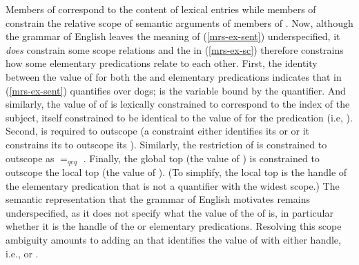 \documentclass[output=paper]{langsci/langscibook}
\begin{document}
Members of  correspond to the content of lexical entries while members of  constrain the relative scope of semantic arguments of members of . Now, although the grammar of English leaves the meaning of (\ref{mrs-ex-sent}) underspecified, it \emph{does} constrain some scope relations and the  in (\ref{mrs-ex-sc}) therefore constrains how some elementary predications relate to each other. First, the identity between the value of  for both the  and  elementary predications indicates that  in (\ref{mrs-ex-sent}) quantifies over dogs;  is the variable bound by the quantifier. And similarly, the value of  of  is lexically constrained to correspond to the index of the subject, itself constrained to be identical to the value of  for the  predication (i.e, ). Second,  is required to outscope  (a  constraint either identifies its  or  or it constrains its  to outscope its ). Similarly, the restriction of  is constrained to  outscope  as  $=_{qeq}$ . Finally, the global top (the value of ) is constrained to outscope the local top (the value of ). (To simplify, the local top is the handle of the elementary predication that is not a quantifier with the widest scope.) The semantic representation that the grammar of English motivates remains underspecified, as it does not specify what the value of the  of  is, in particular whether it is the handle of the  or  elementary predications. Resolving this scope ambiguity amounts to adding an  that identifies the value of  with either handle, i.e.,  or . 
\end{document}
